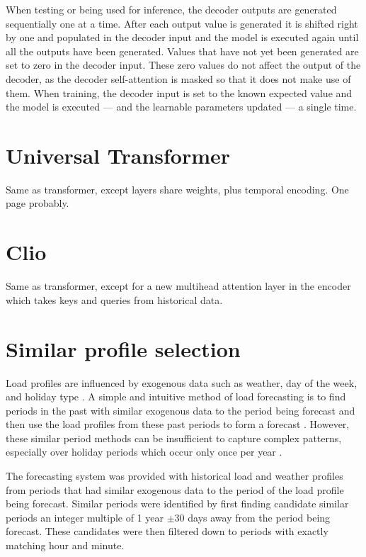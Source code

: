 When testing or being used for inference, the decoder outputs are generated sequentially one at a time.
After each output value is generated it is shifted right by one and populated in the decoder input and the model is executed again until all the outputs have been generated.
Values that have not yet been generated are set to zero in the decoder input.
These zero values do not affect the output of the decoder, as the decoder self-attention is masked so that it does not make use of them.
When training, the decoder input is set to the known expected value and the model is executed --- and the learnable parameters updated --- a single time.

\section{Universal Transformer}
Same as transformer, except layers share weights, plus temporal encoding. One page probably.

\section{Clio}
Same as transformer, except for a new multihead attention layer in the encoder which takes keys and queries from historical data.

\section{Similar profile selection}
Load profiles are influenced by exogenous data such as weather, day of the week, and holiday type \cite{Weron2006}.
A simple and intuitive method of load forecasting is to find periods in the past with similar exogenous data to the period being forecast and then use the load profiles from these past periods to form a forecast \cite{Senjyu1998}.
However, these similar period methods can be insufficient to capture complex patterns, especially over holiday periods which occur only once per year \cite{Chen2010}.


The forecasting system was provided with historical load and weather profiles from periods that had similar exogenous data to the period of the load profile being forecast.
Similar periods were identified by first finding candidate similar periods an integer multiple of 1 year $\pm$30 days away from the period being forecast.
These candidates were then filtered down to periods with exactly matching hour and minute.

